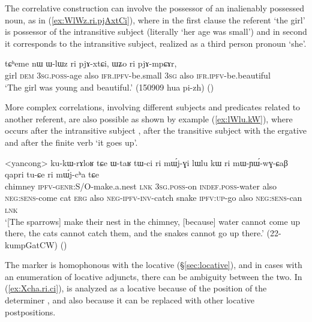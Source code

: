 The correlative construction can involve the possessor of an inalienably possessed noun, as in (\ref{ex:WlWz.ri.pjAxtCi}), where in the first clause the referent `the girl' is possessor of the intransitive subject (literally `her age was small') and in second it corresponds to the intransitive subject, realized as a third person pronoun  `she'.

  \begin{exe}
\ex \label{ex:WlWz.ri.pjAxtCi}
 \gll tɕʰeme nɯ ɯ-lɯz ri pjɤ-xtɕi, ɯʑo ri pjɤ-mpɕɤr,  \\
 girl \textsc{dem} \textsc{3sg}.\textsc{poss}-age also \textsc{ifr}.\textsc{ipfv}-be.small \textsc{3sg} also \textsc{ifr}.\textsc{ipfv}-be.beautiful \\
\glt `The girl was young and beautiful.' (150909 hua pi-zh)
()
 \end{exe}
 
 More complex correlations, involving different subjects and predicates related to another referent, are also possible as shown by example (\ref{ex:lWlu.kW}), where  occurs after the intransitive subject , after the transitive subject  with the ergative and after the finite verb  `it goes up'.
 
 \begin{exe}
\ex   \label{ex:lWlu.kW}
\gll <yancong> ku-kɯ-rɤloʁ tɕe ɯ-taʁ tɯ-ci ri mɯ́j-ɣi lɯlu kɯ ri mɯ-ɲɯ́-wɣ-ɕaβ qapri tu-ɕe ri mɯ́j-cʰa tɕe \\
 chimney \textsc{ipfv}-\textsc{genr}:S/O-make.a.nest \textsc{lnk} \textsc{3sg}.\textsc{poss}-on \textsc{indef}.\textsc{poss}-water also \textsc{neg}:\textsc{sens}-come cat \textsc{erg} also \textsc{neg}-\textsc{ipfv}-\textsc{inv}-catch snake \textsc{ipfv}:\textsc{up}-go also \textsc{neg}:\textsc{sens}-can \textsc{lnk} \\
 \glt `[The sparrows] make their nest in the chimney, [because] water cannot come up there, the cats cannot catch them, and the snakes cannot go up there.' (22-kumpGatCW)
()
 \end{exe} 
 
 The marker  is homophonous with the locative  (§\ref{sec:locative}), and in cases with an enumeration of locative adjuncts, there can be ambiguity between the two. In (\ref{ex:Xcha.ri.ci}),  is analyzed as a locative because of the position of the determiner , and also because it can be replaced with other locative postpositions.
 
